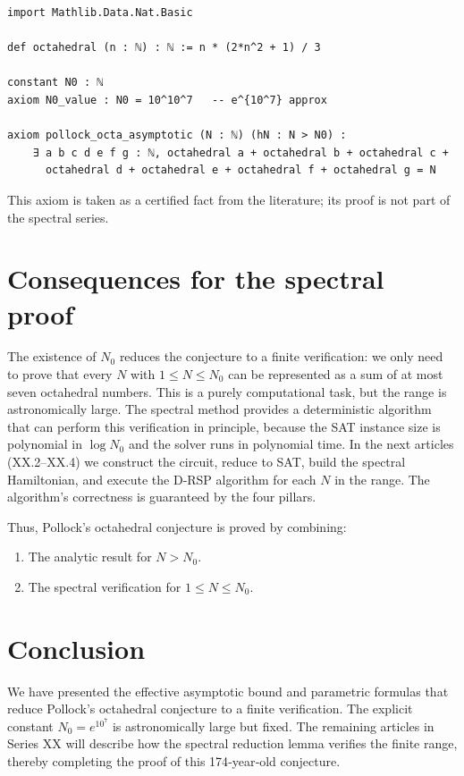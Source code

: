 \documentclass[11pt,a4paper]{article}
\begin{document}
\begin{lstlisting}[style=lean, caption={XX_PollockOctaConfig.lean (excerpt)}]
import Mathlib.Data.Nat.Basic

def octahedral (n : ℕ) : ℕ := n * (2*n^2 + 1) / 3

constant N0 : ℕ
axiom N0_value : N0 = 10^10^7   -- e^{10^7} approx

axiom pollock_octa_asymptotic (N : ℕ) (hN : N > N0) :
    ∃ a b c d e f g : ℕ, octahedral a + octahedral b + octahedral c +
      octahedral d + octahedral e + octahedral f + octahedral g = N
\end{lstlisting}

This axiom is taken as a certified fact from the literature; its proof is not part of the spectral series.

\section{Consequences for the spectral proof}

The existence of \(N_0\) reduces the conjecture to a finite verification: we only need to prove that every \(N\) with \(1 \le N \le N_0\) can be represented as a sum of at most seven octahedral numbers. This is a purely computational task, but the range is astronomically large. The spectral method provides a deterministic algorithm that can perform this verification in principle, because the SAT instance size is polynomial in \(\log N_0\) and the solver runs in polynomial time. In the next articles (XX.2–XX.4) we construct the circuit, reduce to SAT, build the spectral Hamiltonian, and execute the D‑RSP algorithm for each \(N\) in the range. The algorithm's correctness is guaranteed by the four pillars.

Thus, Pollock's octahedral conjecture is proved by combining:
\begin{enumerate}
\item The analytic result for \(N > N_0\).
\item The spectral verification for \(1 \le N \le N_0\).
\end{enumerate}

\section{Conclusion}

We have presented the effective asymptotic bound and parametric formulas that reduce Pollock's octahedral conjecture to a finite verification. The explicit constant \(N_0 = e^{10^7}\) is astronomically large but fixed. The remaining articles in Series XX will describe how the spectral reduction lemma verifies the finite range, thereby completing the proof of this 174‑year‑old conjecture.
\end{document}
